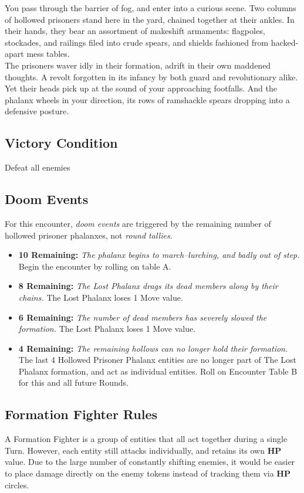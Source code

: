 You pass through the barrier of fog, and enter into a curious scene. Two columns of hollowed prisoners stand here in the yard, chained together at their ankles. In their hands, they bear an assortment of makeshift armaments: flagpoles, stockades, and railings filed into crude spears, and shields fashioned from hacked-apart mess tables.\\

The prisoners waver idly in their formation, adrift in their own maddened thoughts. A revolt forgotten in its infancy by both guard and revolutionary alike. Yet their heads pick up at the sound of your approaching footfalls. And the phalanx wheels in your direction, its rows of ramshackle spears dropping into a defensive posture.

\subsection*{Victory Condition}
Defeat all enemies

\subsection*{Doom Events}
For this encounter, \emph{doom events} are triggered by the remaining number of hollowed prisoner phalanxes, not \emph{round tallies}.

\begin{itemize}
\item \textbf{10 Remaining:} \emph{The phalanx begins to march--lurching, and badly out of step.} Begin the encounter by rolling on table A.
\item \textbf{8 Remaining:} \emph{The Lost Phalanx drags its dead members along by their chains.} The Lost Phalanx loses 1 Move value.
\item \textbf{6 Remaining:} \emph{The number of dead members has severely slowed the formation.} The Lost Phalanx loses 1 Move value.
\item \textbf{4 Remaining:} \emph{The remaining hollows can no longer hold their formation.} The last 4 Hollowed Prisoner Phalanx entities are no longer part of The Lost Phalanx formation, and act as individual entities. Roll on Encounter Table B for this and all future Rounds.
\end{itemize}

\pagebreak

\subsection*{Formation Fighter Rules}
A Formation Fighter is a group of entities that all act together during a single Turn. However, each entity still attacks individually, and retains its own \textbf{HP} value. Due to the large number of constantly shifting enemies, it would be easier to place damage directly on the enemy tokens instead of tracking them via \textbf{HP} circles.\\

